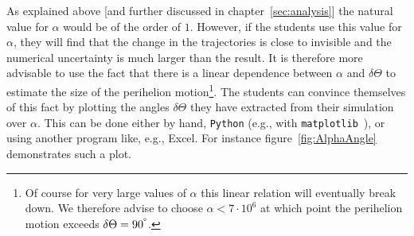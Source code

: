 \documentclass[12pt,ngerman,american]{iopart}
\newcommand{\python}[0]{\texttt{Python}}
\begin{document}
As explained above [and further discussed in chapter~\ref{sec:analysis}] the natural value for $\alpha$ would be of the order of $1$.
However, if the students use this value for $\alpha$, they will find that the change in the trajectories is close to invisible and the numerical uncertainty is much larger than the result.
It is therefore more advisable to use the fact that there is a linear dependence between $\alpha$ and $\delta \Theta$ to estimate the size of the perihelion motion\footnote{%
	Of course for very large values of $\alpha$ this linear relation will eventually break down.
	We therefore advise to choose $\alpha<7\cdot 10^6$ at which point the perihelion motion exceeds $\delta \Theta=90^{\degree}$.
}.
The students can convince themselves of this fact by plotting the angles $\delta \Theta$ they have extracted from their simulation over $\alpha$.
This can be done either by hand, \python{} (e.g., with \texttt{matplotlib}~\cite{Matplotlib}), or using another program like, e.g., Excel.
For instance figure~\ref{fig:AlphaAngle} demonstrates such a plot.
\end{document}
